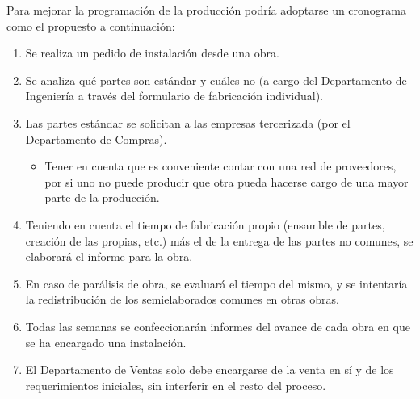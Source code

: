 \documentclass[12pt,a4paper,spanish]{article}
\begin{document}
Para mejorar la programaci\'on de la producci\'on podr\'ia adoptarse un cronograma como el propuesto a continuaci\'on:
\begin{enumerate}
\item Se realiza un pedido de instalaci\'on desde una obra.
\item Se analiza qu\'e partes son est\'andar y cu\'ales no (a cargo del Departamento de Ingenier\'{i}a a trav\'es del formulario de fabricaci\'on individual).
\item Las partes est\'andar se solicitan a las empresas tercerizada (por el Departamento de Compras).
	\begin{itemize}
		\item Tener en cuenta que es conveniente contar con una red de proveedores, por si uno no puede producir que otra pueda hacerse cargo de una mayor parte de la producci\'on.
	\end{itemize}
\item Teniendo en cuenta el tiempo de fabricaci\'on propio (ensamble de partes, creaci\'{o}n de las propias, etc.) m\'as el de la entrega de las partes no comunes, se elaborar\'{a} el informe para la obra.
\item En caso de par\'{a}lisis de obra, se evaluar\'{a} el tiempo del mismo, y se intentar\'ia la redistribuci\'{o}n de los semielaborados comunes en otras obras.
\item Todas las semanas se confeccionar\'an informes del avance de cada obra en que se ha encargado una instalaci\'on.
\item El Departamento de Ventas solo debe encargarse de la venta en s\'i y de los requerimientos iniciales, sin interferir en el resto del proceso.
\end{enumerate}
\end{document}
